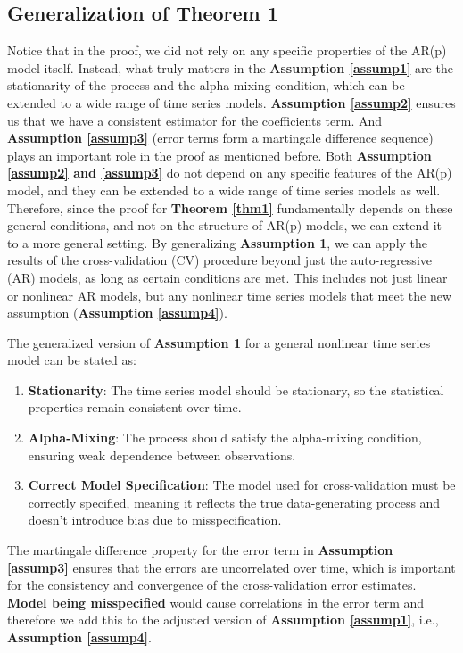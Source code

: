 \documentclass[12pt, oneside]{amsart}
\theoremstyle{definition}
\theoremstyle{remark}
\numberwithin{equation}{section}
\begin{document}
\subsection{Generalization of Theorem 1}
Notice that in the proof, we did not rely on any specific properties of the AR(p) model itself. Instead, what truly matters in the \textbf{Assumption \ref{assump1}} are the stationarity of the process and the alpha-mixing condition, which can be extended to a
wide range of time series models. \textbf{Assumption \ref{assump2}} ensures us that we have a consistent estimator for the coefficients term. And \textbf{Assumption \ref{assump3}} (error terms form a martingale difference sequence) plays an important role in the proof as mentioned before. Both \textbf{Assumption \ref{assump2} and \ref{assump3}} do not depend on any specific features of the AR(p) model, and they can be extended to a wide range of time series models as well. \\

Therefore, since the proof for \textbf{Theorem \ref{thm1}} fundamentally depends on these general conditions, and not on the structure of AR(p) models, we can extend it to a more general setting. By generalizing \textbf{Assumption 1}, we can apply the results of the cross-validation (CV) procedure beyond just the auto-regressive (AR) models, as long as certain conditions are met. This includes not just linear or nonlinear AR models, but any nonlinear time series models that meet the new assumption (\textbf{Assumption \ref{assump4}}). 

\begin{assumption}\label{assump4}
    The generalized version of \textbf{Assumption 1} for a general nonlinear time series model can be stated as:
\begin{enumerate}
    \item \textbf{Stationarity}: The time series model should be stationary, so the statistical properties remain consistent over time.
    \item \textbf{Alpha-Mixing}: The process should satisfy the alpha-mixing condition, ensuring weak dependence between observations.
    \item \textbf{Correct Model Specification}: The model used for cross-validation must be correctly specified, meaning it reflects the true data-generating process and doesn't introduce bias due to misspecification.
\end{enumerate}
\end{assumption}
The martingale difference property for the error term in \textbf{Assumption \ref{assump3}} ensures that the errors are uncorrelated over time, which is important for the consistency and convergence of the cross-validation error estimates. \textbf{Model being misspecified} would cause correlations in the error term and therefore we add this to the adjusted version of \textbf{Assumption \ref{assump1}}, i.e., \textbf{Assumption \ref{assump4}}. \\
\end{document}
